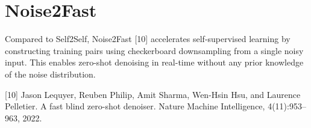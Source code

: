 \chapter{Noise2Fast}

Compared to Self2Self, Noise2Fast [10] accelerates self-supervised learning
by constructing training pairs using checkerboard downsampling from a single noisy input. This enables zero-shot
denoising in real-time without any prior knowledge of the noise distribution. %

[10] Jason Lequyer, Reuben Philip, Amit Sharma, Wen-Hsin Hsu, and Laurence Pelletier. A fast blind zero-shot
denoiser. Nature Machine Intelligence, 4(11):953–963, 2022.

